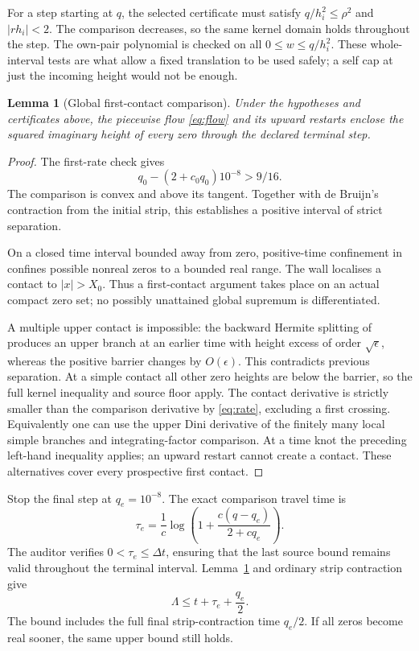 \documentclass[11pt,a4paper]{article}
\newtheorem{lemma}[theorem]{Lemma}
\theoremstyle{definition}\newtheorem{definition}[theorem]{Definition}
\theoremstyle{remark}\newtheorem{remark}[theorem]{Remark}
\begin{document}
For a step starting at $q$, the selected certificate must satisfy
$q/h_i^2\le\rho^2$ and $|rh_i|<2$. The comparison decreases, so the same
kernel domain holds throughout the step. The own-pair polynomial is
checked on all $0\le w\le q/h_i^2$. These whole-interval tests are what
allow a fixed translation to be used safely; a self cap at just the
incoming height would not be enough.

\begin{lemma}[Global first-contact comparison]\label{lem:contact}
Under the hypotheses and certificates above, the piecewise flow
\eqref{eq:flow} and its upward restarts enclose the squared imaginary
height of every zero through the declared terminal step.
\end{lemma}
\begin{proof}
The first-rate check gives
\[
q_0-(2+c_0q_0)10^{-8}>9/16.
\]
The comparison is convex and above its tangent. Together with de Bruijn's
contraction from the initial strip, this establishes a positive interval
of strict separation.

On a closed time interval bounded away from zero, positive-time confinement
in \cite[Theorem 1.5(i)]{polymath} confines possible nonreal zeros to a
bounded real range. The wall localises a contact to $|x|>X_0$. Thus a
first-contact argument takes place on an actual compact zero set; no
possibly unattained global supremum is differentiated.

A multiple upper contact is impossible: the backward Hermite splitting of
\cite[Proposition 3.1(ii)]{polymath} produces an upper branch at an earlier
time with height excess of order $\sqrt\epsilon$, whereas the positive
barrier changes by $O(\epsilon)$. This contradicts previous separation.
At a simple contact all other zero heights are below the barrier, so the
full kernel inequality and source floor apply. The contact derivative is
strictly smaller than the comparison derivative by \eqref{eq:rate},
excluding a first crossing. Equivalently one can use the upper Dini
derivative of the finitely many local simple branches and integrating-factor
comparison. At a time knot the preceding left-hand inequality applies;
an upward restart cannot create a contact. These alternatives cover every
prospective first contact.
\end{proof}

Stop the final step at $q_e=10^{-8}$. The exact comparison travel time is
\begin{equation}\label{eq:lag}
\tau_e=\frac1c\log\left(1+\frac{c(q-q_e)}{2+cq_e}\right).
\end{equation}
The auditor verifies $0<\tau_e\le\Delta t$, ensuring that the last source
bound remains valid throughout the terminal interval. Lemma~\ref{lem:contact} and ordinary strip
contraction give
\begin{equation}\label{eq:terminal}
\Lambda\le t+\tau_e+\frac{q_e}{2}.
\end{equation}
The bound includes the full final strip-contraction time $q_e/2$.
If all zeros become real sooner, the same upper bound still holds.
\end{document}
